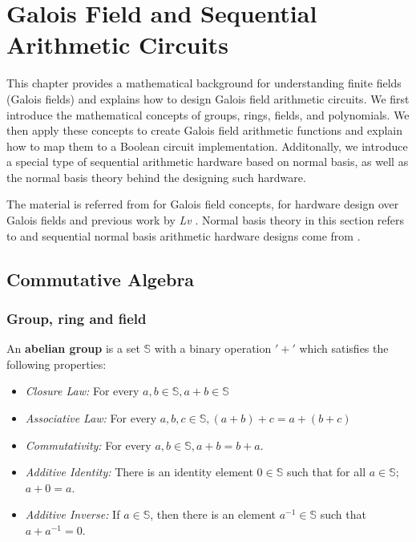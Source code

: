 \chapter{Galois Field and Sequential Arithmetic Circuits}
\label{ch:prelim_GF}
This chapter provides a mathematical background for understanding 
finite fields (Galois fields) and explains how to design Galois field arithmetic circuits.
We first introduce the mathematical concepts of groups, rings, fields, and 
polynomials. 
We then apply these concepts to create Galois field arithmetic functions and 
explain how to map them to a Boolean circuit implementation.
Additonally, we introduce a special type of sequential arithmetic hardware based on normal basis, as well
as the normal basis theory behind the designing such hardware.

The material is referred from \cite{galois_field:mceliece, ftheory:2006, ff:1997} for Galois field concepts, 
\cite{mastro:1989, PT:1985, acar:1998, wu:2002, Knezevic:2008} for hardware design over Galois fields 
and previous work by {\it Lv} \cite{lv:phd}.
Normal basis theory in this section refers to \cite{normal_book, gao:phd_normal_basis} and sequential
normal basis arithmetic hardware designs come from \cite{mullinONB,MasseyOmura,agnew1991implementation, RHmulti}.

\section{Commutative Algebra}
\label{sec:algebra}
\subsection{Group, ring and field}
\begin{Definition}
An {\bf abelian group} is a set $\mathbb{S}$ with a binary operation $'+'$
which satisfies the following properties: 
\begin{itemize}
\item {\it Closure Law:} For every $a, b \in \mathbb{S}, a + b \in \mathbb{S}$  
\item {\it Associative Law:} For every $a, b, c \in \mathbb{S}, (a + b) + c = a + (b + c)$
\item {\it Commutativity:} For every $a, b \in \mathbb{S}, a + b = b + a$. 
\item {\it Additive Identity:} There is an identity element $0 \in \mathbb{S}$
such that for all $a \in \mathbb{S};$ $a + 0 = a$.
\item {\it Additive Inverse:} If $a \in \mathbb{S}$, then there is an
element $a^{-1} \in \mathbb{S}$ such that $ a + a^{-1} = 0$.
\end{itemize}
\end{Definition}

